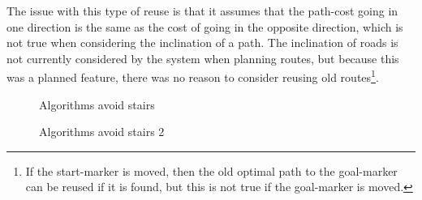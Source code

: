 The issue with this type of reuse is that it assumes that the path-cost going in one direction is the same as the cost of going in the opposite direction, which is not true when considering the inclination of a path. The inclination of roads is not currently considered by the system when planning routes, but because this was a planned feature, there was no reason to consider reusing old routes\footnote{If the start-marker is moved, then the old optimal path to the goal-marker can be reused if it is found, but this is not true if the goal-marker is moved.}.

\begin{figure}
	\centering
	\caption{Algorithms avoid stairs}
	\label{fig:avoidStairs}
\end{figure}
\begin{figure}
	\centering
	\caption{Algorithms avoid stairs 2}
	\label{fig:avoidStairs2}
\end{figure}

